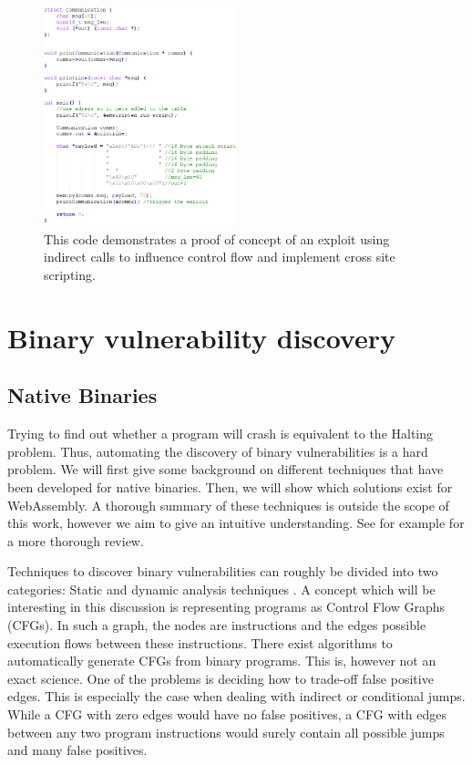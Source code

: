\documentclass[sigconf]{acmart}
\begin{document}
\begin{figure}[h]
  \centering
  \includegraphics[width=0.5\textwidth]{redirect_control_flow}
  \caption{This code demonstrates a proof of concept of an exploit using indirect calls to influence control flow and implement cross site scripting.}  
\label{fig:vuln_example_redirect_control_flow}
\end{figure}

\section{Binary vulnerability discovery}
\subsection{Native Binaries}
Trying to find out whether a program will crash is equivalent to the Halting problem. Thus, automating the discovery of binary vulnerabilities is a hard problem. We will first give some background on different techniques that have been developed for native binaries. Then, we will show which solutions exist for WebAssembly. A thorough summary of these techniques is outside the scope of this work, however we aim to give an intuitive understanding. See for example \cite{sun_new_2018} for a more thorough review.

Techniques to discover binary vulnerabilities can roughly be divided into two categories: Static and dynamic analysis techniques \cite{shoshitaishvili_sok_2016}. A concept which will be interesting in this discussion is representing programs as Control Flow Graphs (CFGs). In such a graph, the nodes are instructions and the edges possible execution flows between these instructions. There exist algorithms to automatically generate CFGs from binary programs. This is, however not an exact science. One of the problems is deciding how to trade-off false positive edges. This is especially the case when dealing with indirect or conditional jumps. While a CFG with zero edges would have no false positives, a CFG with edges between any two program instructions would surely contain all possible jumps and many false positives. 
\end{document}
